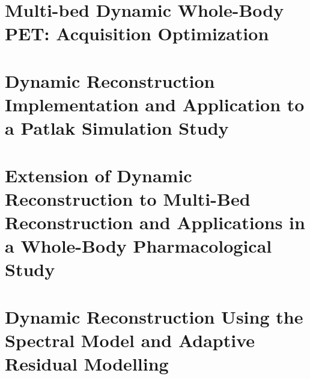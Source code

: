 
\chapter{Multi-bed Dynamic Whole-Body PET: Acquisition Optimization}
\label{Chap3_1:AcquisitionOptimization}


\chapter{Dynamic Reconstruction Implementation and Application to a Patlak Simulation Study}
\label{Chap3_2:SimStudy}


\chapter[Extension of Dynamic Reconstruction to Multi-Bed Reconstruction]{Extension of Dynamic Reconstruction to Multi-Bed Reconstruction and Applications in a Whole-Body Pharmacological Study}
\label{Chap3_3:IsotoPK}


\chapter{Dynamic Reconstruction Using the Spectral Model and Adaptive Residual Modelling}
\label{Chap3_4:Residual}
